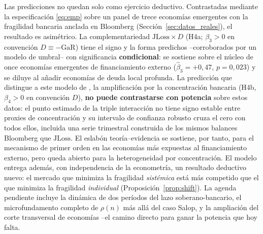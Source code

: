 \documentclass[11pt]{article}
\theoremstyle{plain}
\theoremstyle{definition}
\theoremstyle{remark}
\newcommand{\JLoss}{\mathrm{JLoss}}
\newcommand{\GaR}{\mathrm{GaR}}
\newcommand{\1}{\mathbf{1}}
\begin{document}
Las predicciones no quedan solo como ejercicio deductivo. Contrastadas mediante la especificación \eqref{eq:emp} sobre un panel de trece economías emergentes con la fragilidad bancaria anclada en Bloomberg (Sección~\ref{sec:datos_reales}), el resultado es asimétrico. La complementariedad $\JLoss\times D$ (H4a; $\beta_3>0$ en convención $D\equiv-\GaR$) tiene el signo y la forma predichos --corroborados por un modelo de umbral-- con significancia \textbf{condicional}: se sostiene sobre el núcleo de once economías emergentes de financiamiento externo ($\hat\beta_3=+0{,}47$, $p=0{,}023$) y se diluye al añadir economías de deuda local profunda. La predicción que distingue a este modelo de \citet{MMR2010}, la amplificación por la concentración bancaria (H4b, $\beta_4>0$ en convención $D$), \textbf{no puede contrastarse con potencia} sobre estos datos: el punto estimado de la triple interacción no tiene signo estable entre proxies de concentración y su intervalo de confianza robusto cruza el cero con todos ellos, incluida una serie trimestral construida de los mismos balances Bloomberg que $\JLoss$. El eslabón teoría--evidencia se sostiene, por tanto, para el mecanismo de primer orden en las economías más expuestas al financiamiento externo, pero queda abierto para la heterogeneidad por concentración. El modelo entrega además, con independencia de la econometría, un resultado deductivo nuevo: el mercado que minimiza la fragilidad \emph{sistémica} está más competido que el que minimiza la fragilidad \emph{individual} (Proposición~\ref{prop:shift}). La agenda pendiente incluye la dinámica de dos períodos del lazo soberano-bancario, el microfundamento completo de $\rho(n)$ más allá del caso Salop, y la ampliación del corte transversal de economías --el camino directo para ganar la potencia que hoy falta.
\end{document}
